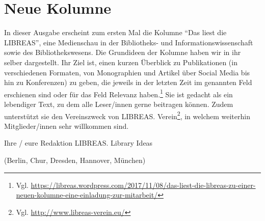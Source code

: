 \documentclass[a4paper,
fontsize=11pt,
oneside,
numbers=noperiodatend,
parskip=half-,
bibliography=totoc,
final
]{scrartcl}
\begin{document}
\hypertarget{neue-kolumne}{%
\section*{Neue Kolumne}\label{neue-kolumne}}

In dieser Ausgabe erscheint zum ersten Mal die Kolumne \enquote{Das
liest die LIBREAS}, eine Medienschau in der Bibliotheks- und
Informationswissenschaft sowie des Bibliothekswesens. Die Grundideen der
Kolumne haben wir in ihr selber dargestellt. Ihr Ziel ist, einen kurzen
Überblick zu Publikationen (in verschiedenen Formaten, von Monographien
und Artikel über Social Media bis hin zu Konferenzen) zu geben, die
jeweils in der letzten Zeit im genannten Feld erschienen sind oder für
das Feld Relevanz haben.\footnote{Vgl.
  \url{https://libreas.wordpress.com/2017/11/08/das-liest-die-libreas-zu-einer-neuen-kolumne-eine-einladung-zur-mitarbeit/}}
Sie ist gedacht als ein lebendiger Text, zu dem alle Leser/innen gerne
beitragen können. Zudem unterstützt sie den Vereinszweck von LIBREAS.
Verein\footnote{Vgl. \url{http://www.libreas-verein.eu/}}, in welchem
weiterhin Mitglieder/innen sehr willkommen sind.

Ihre / eure Redaktion LIBREAS. Library Ideas

(Berlin, Chur, Dresden, Hannover, München)

\end{document}
